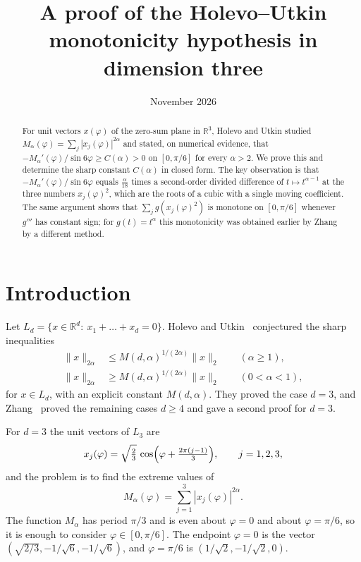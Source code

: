 \documentclass[11pt]{amsart}
\title{A proof of the Holevo--Utkin monotonicity hypothesis in dimension three}
\date{November 2026}
\theoremstyle{remark}
\newcommand{\R}{\mathbb{R}}
\begin{document}
\begin{abstract}
For unit vectors $x(\varphi)$ of the zero-sum plane in $\R^3$, Holevo and Utkin
studied $M_\alpha(\varphi)=\sum_{j}|x_j(\varphi)|^{2\alpha}$ and stated, on numerical
evidence, that $-M_\alpha'(\varphi)/\sin 6\varphi\ge C(\alpha)>0$ on $[0,\pi/6]$ for
every $\alpha>2$. We prove this and determine the sharp constant $C(\alpha)$ in closed
form. The key observation is that $-M_\alpha'(\varphi)/\sin 6\varphi$ equals
$\tfrac{\alpha}{18}$ times a second-order divided difference of $t\mapsto t^{\alpha-1}$
at the three numbers $x_j(\varphi)^2$, which are the roots of a cubic with a single
moving coefficient. The same argument shows that $\sum_j g(x_j(\varphi)^2)$ is monotone
on $[0,\pi/6]$ whenever $g'''$ has constant sign; for $g(t)=t^\alpha$ this monotonicity
was obtained earlier by Zhang by a different method.
\end{abstract}

\maketitle

\section{Introduction}

Let $L_d=\{x\in\R^d:\ x_1+\dots+x_d=0\}$. Holevo and Utkin~\cite{HU} conjectured the
sharp inequalities
\begin{align*}
\|x\|_{2\alpha}&\le M(d,\alpha)^{1/(2\alpha)}\|x\|_2\qquad(\alpha\ge1),\\
\|x\|_{2\alpha}&\ge M(d,\alpha)^{1/(2\alpha)}\|x\|_2\qquad(0<\alpha<1),
\end{align*}
for $x\in L_d$,
with an explicit constant $M(d,\alpha)$. They proved the case $d=3$, and
Zhang~\cite{Z} proved the remaining cases $d\ge4$ and gave a second proof for $d=3$.

For $d=3$ the unit vectors of $L_3$ are
\begin{equation}\label{eq:x}
x_j(\varphi)=\sqrt{\tfrac23}\,\cos\Bigl(\varphi+\tfrac{2\pi(j-1)}{3}\Bigr),\qquad j=1,2,3,
\end{equation}
and the problem is to find the extreme values of
\[
M_\alpha(\varphi)=\sum_{j=1}^{3}|x_j(\varphi)|^{2\alpha}.
\]
The function $M_\alpha$ has period $\pi/3$ and is even about $\varphi=0$ and about
$\varphi=\pi/6$, so it is enough to consider $\varphi\in[0,\pi/6]$. The endpoint
$\varphi=0$ is the vector $(\sqrt{2/3},-1/\sqrt6,-1/\sqrt6)$, and $\varphi=\pi/6$ is
$(1/\sqrt2,-1/\sqrt2,0)$.
\end{document}
